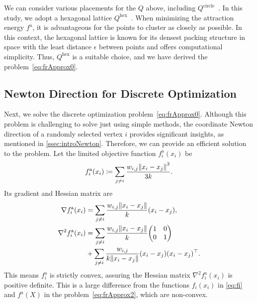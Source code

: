 \documentclass[dvipdfmx,10pt,journal,compsoc]{IEEEtran}
\newcommand{\defeq}{\coloneqq}
\begin{document}
We can consider various placements for the $Q$ above, including $Q^\mathrm{circle}$~\cite{ghassemitoosiSimulatedAnnealingPreProcessing2016}.
In this study, we adopt a hexagonal lattice $Q^\mathrm{hex}$~\cite{patelHexagonalGrids2013,s22145179}.
When minimizing the attraction energy $f^\mathrm{a}$, it is advantageous for the points to cluster as closely as possible. In this context, the hexagonal lattice is known for its densest packing structure in space with the least distance $\epsilon$ between points and offers computational simplicity. Thus, $Q^\mathrm{hex}$ is a suitable choice, and we have derived the problem~\eqref{eq:frApprox0}.

\subsection{Newton Direction for Discrete Optimization}\label{ssec:newtonDirection}

Next, we solve the discrete optimization problem~\eqref{eq:frApprox0}.
Although this problem is challenging to solve just using simple methods, the coordinate Newton direction of a randomly selected vertex $i$ provides significant insights, as mentioned in \cref{ssec:introNewton}. Therefore, we can provide an efficient solution to the problem.
Let the limited objective function $f^{\mathrm{a}}_i(x_i)$ be
\begin{equation*}
  f^{\mathrm{a}}_i(x_i) \defeq \sum_{j \neq i} \frac{w_{i,j}\norm{x_i - x_j}^3}{3k}.
\end{equation*}
Its gradient and Hessian matrix are
\begin{align*}
  \nabla f^{\mathrm{a}}_i(x_i)   & = \sum_{j \neq i} \frac{w_{i,j}\norm{x_i - x_j}}{k} (x_i - x_j),                     \\
  \nabla^2 f^{\mathrm{a}}_i(x_i) & = \sum_{j \neq i} \frac{w_{i,j}\norm{x_i - x_j}}{k} \mqty(1                      & 0 \\0&1) \\
                                 & + \sum_{j \neq i} \frac{w_{i,j}}{k\norm{x_i - x_j}} (x_i - x_j)(x_i - x_j)^\top.
\end{align*}
This means $f^{\mathrm{a}}_i$ is strictly convex, assuring the Hessian matrix $\nabla^2 f^{\mathrm{a}}_i(x_i)$ is positive definite. This is a large difference from the functions $f_i(x_i)$ in \cref{eq:fi} and $f^{\mathrm{a}}(X)$ in the problem~\eqref{eq:frApprox2}, which are non-convex.
\end{document}
